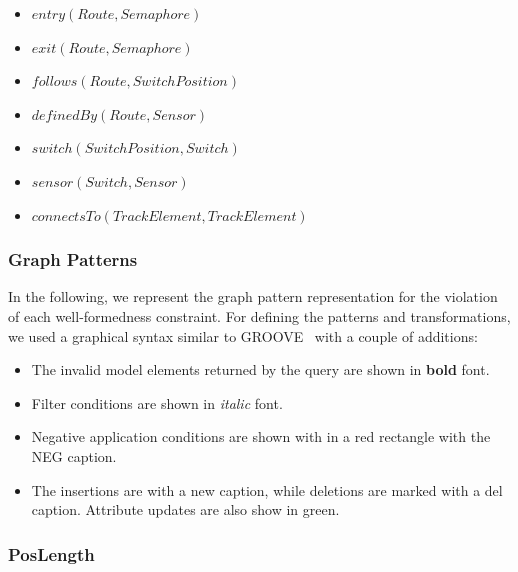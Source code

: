 \begin{itemize}
  \item $ \mathit{entry}\left(\mathit{Route}, \mathit{Semaphore}\right) $
  \item $ \mathit{exit}\left(\mathit{Route}, \mathit{Semaphore}\right) $
  \item $ \mathit{follows}\left(\mathit{Route}, \mathit{SwitchPosition}\right) $
  \item $ \mathit{definedBy}\left(\mathit{Route}, \mathit{Sensor}\right) $
  \item $ \mathit{switch}\left(\mathit{SwitchPosition}, \mathit{Switch}\right) $
  \item $ \mathit{sensor}\left(\mathit{Switch}, \mathit{Sensor}\right) $
  \item $ \mathit{connectsTo}\left(\mathit{TrackElement}, \mathit{TrackElement}\right) $
\end{itemize}

\subsubsection{Graph Patterns}

In the following, we represent the graph pattern representation for the violation of each well-formedness constraint. For defining the patterns and transformations, we used a graphical syntax similar to GROOVE~\cite{rensink2004groove} with a couple of additions:

\begin{itemize}
  \item The invalid model elements returned by the query are shown in \textbf{bold} font.
  \item Filter conditions are shown in \textit{italic} font.
  \item Negative application conditions are shown with in a \textcolor{negcolor}{red} rectangle with the \textcolor{negcolor}{\textsf{NEG}} caption.
  \item The insertions are with a \textcolor{newcolor}{\guillemotleft{}new\guillemotright{}} caption, while deletions are marked with a \textcolor{delcolor}{\guillemotleft{}del\guillemotright{}} caption. Attribute updates are also show in \textcolor{newcolor}{green}.
\end{itemize}



\subsubsection{PosLength}

